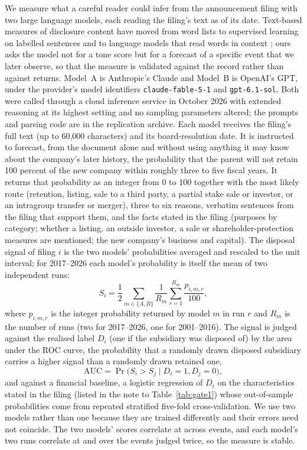 We measure what a careful reader could infer from the announcement filing with two large language models, each reading the filing's text as of its date. Text-based measures of disclosure content have moved from word lists \cite{loughran2011} to supervised learning on labelled sentences \cite{frankel2022} and to language models that read words in context \cite{siano2025}; ours asks the model not for a tone score but for a forecast of a specific event that we later observe, so that the measure is validated against the record rather than against returns. Model~A is Anthropic's Claude and Model~B is OpenAI's GPT, under the provider's model identifiers \texttt{claude-fable-5-1} and \texttt{gpt-6.1-sol}. Both were called through a cloud inference service in October 2026 with extended reasoning at its highest setting and no sampling parameters altered; the prompts and parsing code are in the replication archive. Each model receives the filing's full text (up to 60,000 characters) and its board-resolution date. It is instructed to forecast, from the document alone and without using anything it may know about the company's later history, the probability that the parent will not retain 100 percent of the new company within roughly three to five fiscal years. It returns that probability as an integer from 0 to 100 together with the most likely route (retention, listing, sale to a third party, a partial stake sale or investor, or an intragroup transfer or merger), three to six reasons, verbatim sentences from the filing that support them, and the facts stated in the filing (purposes by category; whether a listing, an outside investor, a sale or shareholder-protection measures are mentioned; the new company's business and capital). The disposal signal of filing $i$ is the two models' probabilities averaged and rescaled to the unit interval; for 2017--2026 each model's probability is itself the mean of two independent runs:
\begin{equation}\label{eq:signal}
S_i = \frac{1}{2}\sum_{m\in\{A,B\}}\frac{1}{R_m}\sum_{r=1}^{R_m}\frac{p_{i,m,r}}{100},
\end{equation}
where $p_{i,m,r}$ is the integer probability returned by model $m$ in run $r$ and $R_m$ is the number of runs (two for 2017--2026, one for 2001--2016). The signal is judged against the realised label $D_i$ (one if the subsidiary was disposed of) by the area under the ROC curve, the probability that a randomly drawn disposed subsidiary carries a higher signal than a randomly drawn retained one,
\begin{equation}\label{eq:auc}
\mathrm{AUC} = \Pr\bigl(S_i > S_j \mid D_i = 1, D_j = 0\bigr),
\end{equation}
and against a financial baseline, a logistic regression of $D_i$ on the characteristics stated in the filing (listed in the note to Table~\ref{tab:gate1}) whose out-of-sample probabilities come from repeated stratified five-fold cross-validation. We use two models rather than one because they are trained differently and their errors need not coincide. The two models' scores correlate at \BetweenModelCorr{} across events, and each model's two runs correlate at \RepeatCorrA{} and \RepeatCorrB{} over the \NRepeat{} events judged twice, so the measure is stable.

